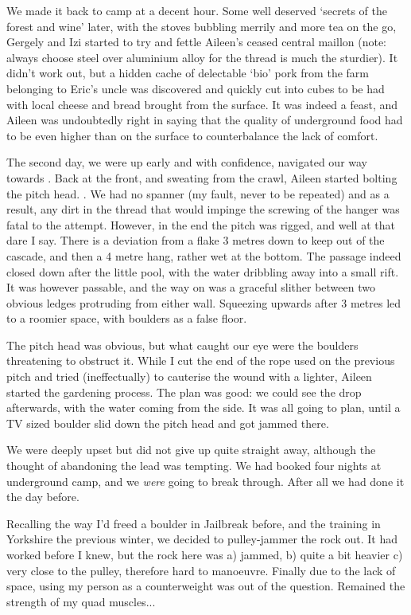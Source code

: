 We made it back to camp at a decent hour. Some well deserved `secrets of the forest and wine' later, with the stoves bubbling merrily and more tea on the go, Gergely and Izi started to try and fettle Aileen's ceased central maillon (note: always choose steel over aluminium alloy for the thread is much the sturdier). It didn't work out, but a hidden cache of delectable `bio' pork from the farm belonging to Eric's uncle was discovered and quickly cut into cubes to be had with local cheese and bread brought from the surface. It was indeed a feast, and Aileen was undoubtedly right in saying that the quality of underground food had to be even higher than on the surface to counterbalance the lack of comfort.

The second day, we were up early and with confidence, navigated our way towards . Back at the front, and sweating from the crawl, Aileen started bolting the pitch head. . We had no spanner (my fault, never to be repeated) and as a result, any dirt in the thread that would impinge the screwing of the hanger was fatal to the attempt. However, in the end the pitch was rigged, and well at that dare I say. There is a deviation from a flake 3 metres down to keep out of the cascade, and then a 4 metre hang, rather wet at the bottom. The passage indeed closed down after the little pool, with the water dribbling away into a small rift. It was however passable, and the way on was a graceful slither between two obvious ledges protruding from either wall. Squeezing upwards after 3 metres led to a roomier space, with boulders as a false floor.

The pitch head was obvious, but what caught our eye were the boulders threatening to obstruct it. While I cut the end of the rope used on the previous pitch and tried (ineffectually) to cauterise the wound with a lighter, Aileen started the gardening process. The plan was good: we could see the drop afterwards, with the water coming from the side. It was all going to plan, until a TV sized boulder slid down the pitch head and got jammed there. 

We were deeply upset but did not give up quite straight away, although the thought of abandoning the lead  was tempting.  We had booked four nights at underground camp, and we \emph{were} going to break through. After all we had done it the day before.

Recalling the way I'd freed a boulder in Jailbreak before, and the training in Yorkshire the previous winter, we decided to pulley-jammer the rock out. It had worked before I knew, but the rock here was a) jammed, b) quite a bit heavier c) very close to the pulley, therefore hard to manoeuvre. Finally due to the lack of space, using my person as a counterweight was out of the question. Remained the strength of my quad muscles...

